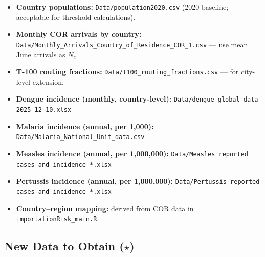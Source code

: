 \documentclass[12pt]{article}
\begin{document}
\begin{itemize}
  \item \textbf{Country populations:} \texttt{Data/population2020.csv}
        (2020 baseline; acceptable for threshold calculations).
  \item \textbf{Monthly COR arrivals by country:}
        \texttt{Data/Monthly\_Arrivals\_Country\_of\_Residence\_COR\_1.csv}
        — use mean June arrivals as $N_c$.
  \item \textbf{T-100 routing fractions:}
        \texttt{Data/t100\_routing\_fractions.csv}
        — for city-level extension.
  \item \textbf{Dengue incidence (monthly, country-level):}
        \texttt{Data/dengue-global-data-2025-12-10.xlsx}
  \item \textbf{Malaria incidence (annual, per 1,000):}
        \texttt{Data/Malaria\_National\_Unit\_data.csv}
  \item \textbf{Measles incidence (annual, per 1,000,000):}
        \texttt{Data/Measles reported cases and incidence *.xlsx}
  \item \textbf{Pertussis incidence (annual, per 1,000,000):}
        \texttt{Data/Pertussis reported cases and incidence *.xlsx}
  \item \textbf{Country--region mapping:}
        derived from COR data in \texttt{importationRisk\_main.R}.
\end{itemize}

\subsection{New Data to Obtain ($\star$)}
\end{document}
